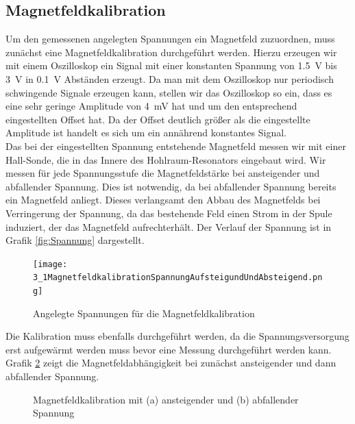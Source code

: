 \documentclass{scrartcl}
\begin{document}
\subsection{Magnetfeldkalibration}
Um den gemessenen angelegten Spannungen ein Magnetfeld zuzuordnen, muss zunächst eine Magnetfeldkalibration durchgeführt werden.
Hierzu erzeugen wir mit einem Oszilloskop ein Signal mit einer konstanten Spannung von \SI{1.5}{V} bis \SI{3}{V} in \SI{0.1}{V} Abständen erzeugt. Da man mit dem Oszilloskop nur periodisch schwingende Signale erzeugen kann, stellen wir das Oszilloskop so ein, dass es eine sehr geringe Amplitude von \SI{4}{mV} hat und um den entsprechend eingestellten Offset hat. Da der Offset deutlich größer als die eingestellte Amplitude ist handelt es sich um ein annährend konstantes Signal. \\
Das bei der eingestellten Spannung entstehende Magnetfeld messen wir mit einer Hall-Sonde, die in das Innere des Hohlraum-Resonators eingebaut wird. Wir messen für jede Spannungsstufe die Magnetfeldstärke bei ansteigender und abfallender Spannung. Dies ist notwendig, da bei abfallender Spannung bereits ein Magnetfeld anliegt. Dieses verlangsamt den Abbau des Magnetfelds bei Verringerung der Spannung, da das bestehende Feld einen Strom in der Spule induziert, der das Magnetfeld aufrechterhält. Der Verlauf der Spannung ist in Grafik \ref{fig:Spannung} dargestellt. 
\begin{figure}[h!]
    \centering
    \texttt{[image: 3\_1MagnetfeldkalibrationSpannungAufsteigundUndAbsteigend.png]}
    \caption{Angelegte Spannungen für die Magnetfeldkalibration}
    \label{Spannung}
\end{figure}
Die Kalibration muss ebenfalls durchgeführt werden, da die Spannungsversorgung erst aufgewärmt werden muss bevor eine Messung durchgeführt werden kann. 
Grafik \ref*{fig:Magnetfeldkalibration} zeigt die Magnetfeldabhängigkeit bei zunächst ansteigender und dann abfallender Spannung.
\begin{figure}[h!]
    \centering
    \caption{Magnetfeldkalibration mit (a) ansteigender und (b) abfallender Spannung}
    \label{fig:Magnetfeldkalibration}
\end{figure}
\end{document}
